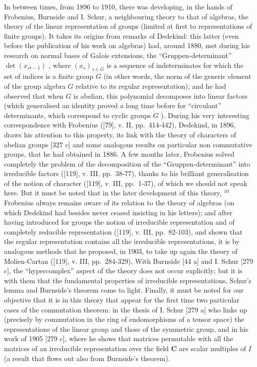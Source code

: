 In between times, from 1896 to 1910, there was developing, in the hands of Frobenius, Burnside and I. Schur, a neighbouring theory to that of algebras, the theory of the linear representation of groups (limited at first to representations of finite groups). It takes its origins from remarks of Dedekind: this latter (even before the publication of his work on algebras) had, around 1880, met during his research on normal bases of Galois extensions, the ``Gruppen-determinant'' \(\det(x_{st-1})\) , where \((x_s)_{s \in G}\) is a sequence of indeterminates for which the set of indices is a finite group \(G\) (in other words, the norm of the generic element of the group algebra \(G\) relative to its regular representation); and he had observed that when \(G\) is abelian, this polynomial decomposes into linear factors (which generalised an identity proved a long time before for ``circulant'' determinants, which correspond to cyclic groups \(G\) ). During his very interesting correspondence with Frobenius ({[}79{]}, v. II, pp.~414-442), Dedekind, in 1896, draws his attention to this property, its link with the theory of characters of abelian groups {[}327 c{]} and some analogous results on particular non commutative groups, that he had obtained in 1886. A few months later, Frobenius solved completely the problem of the decomposition of the ``Gruppen-determinant'' into irreducible factors ({[}119{]}, v. III, pp.~38-77), thanks to his brilliant generalisation of the notion of character ({[}119{]}, v. III, pp.~1-37), of which we should not speak here. But it must be noted that in the later development of this theory, \(^{10}\) Frobenius always remains aware of its relation to the theory of algebras (on which Dedekind had besides never ceased insisting in his letters); and after having introduced for groups the notion of irreducible representation and of completely reducible representation ({[}119{]}, v. III, pp.~82-103), and shown that the regular representation contains all the irreducible representations, it is by analogous methods that he proposed, in 1903, to take up again the theory of Molien-Cartan ({[}119{]}, v. III, pp.~284-329). With Burnside {[}44 a{]} and I. Schur {[}279 c{]}, the ``hypercomplex'' aspect of the theory does not occur explicitly; but it is with them that the fundamental properties of irreducible representations, Schur's lemma and Burnside's theorem come to light. Finally, it must be noted for our objective that it is in this theory that appear for the first time two particular cases of the commutation theorem: in the thesis of I. Schur {[}279 a{]} who links up (precisely by commutation in the ring of endomorphisms of a tensor space) the representations of the linear group and those of the symmetric group, and in his work of 1905 {[}279 c{]}, where he shows that matrices permutable with all the matrices of an irreducible representation over the field \(\mathbf{C}\) are scalar multiples of \(I\) (a result that flows out also from Burnside's theorem).

